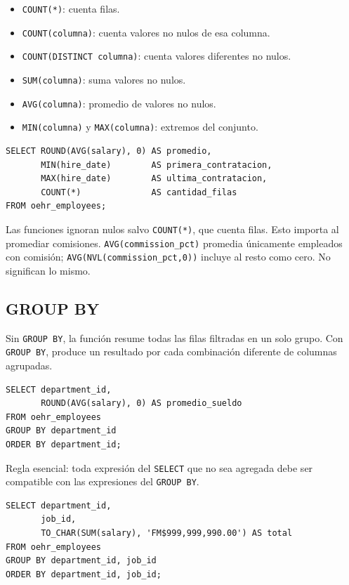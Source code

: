 \documentclass[11pt,a4paper]{article}
\newcommand{\campo}[1]{\texttt{#1}}
\begin{document}
\begin{itemize}
  \item \campo{COUNT(*)}: cuenta filas.
  \item \campo{COUNT(columna)}: cuenta valores no nulos de esa columna.
  \item \campo{COUNT(DISTINCT columna)}: cuenta valores diferentes no nulos.
  \item \campo{SUM(columna)}: suma valores no nulos.
  \item \campo{AVG(columna)}: promedio de valores no nulos.
  \item \campo{MIN(columna)} y \campo{MAX(columna)}: extremos del conjunto.
\end{itemize}

\begin{lstlisting}
SELECT ROUND(AVG(salary), 0) AS promedio,
       MIN(hire_date)        AS primera_contratacion,
       MAX(hire_date)        AS ultima_contratacion,
       COUNT(*)              AS cantidad_filas
FROM oehr_employees;
\end{lstlisting}

Las funciones ignoran nulos salvo \campo{COUNT(*)}, que cuenta filas. Esto importa al promediar
comisiones. \campo{AVG(commission\_pct)} promedia únicamente empleados con comisión;
\campo{AVG(NVL(commission\_pct,0))} incluye al resto como cero. No significan lo mismo.

\subsection{GROUP BY}

Sin \campo{GROUP BY}, la función resume todas las filas filtradas en un solo grupo. Con
\campo{GROUP BY}, produce un resultado por cada combinación diferente de columnas agrupadas.

\begin{lstlisting}
SELECT department_id,
       ROUND(AVG(salary), 0) AS promedio_sueldo
FROM oehr_employees
GROUP BY department_id
ORDER BY department_id;
\end{lstlisting}

Regla esencial: toda expresión del \campo{SELECT} que no sea agregada debe ser compatible con las
expresiones del \campo{GROUP BY}.

\begin{lstlisting}
SELECT department_id,
       job_id,
       TO_CHAR(SUM(salary), 'FM$999,999,990.00') AS total
FROM oehr_employees
GROUP BY department_id, job_id
ORDER BY department_id, job_id;
\end{lstlisting}
\end{document}
